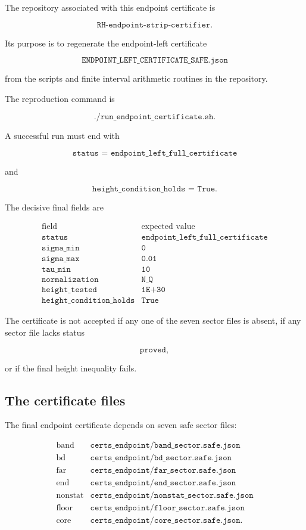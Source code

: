 \documentclass[11pt]{article}
\begin{document}
The repository associated with this endpoint certificate is

\[
\texttt{RH-endpoint-strip-certifier}.
\]

Its purpose is to regenerate the endpoint-left certificate

\[
\texttt{ENDPOINT\_LEFT\_CERTIFICATE\_SAFE.json}
\]

from the scripts and finite interval arithmetic routines in the repository.

The reproduction command is

\[
\texttt{./run\_endpoint\_certificate.sh}.
\]

A successful run must end with

\[
\texttt{status = endpoint\_left\_full\_certificate}
\]

and

\[
\texttt{height\_condition\_holds = True}.
\]

The decisive final fields are

\[
\begin{array}{ll}
\text{field} & \text{expected value} \\ \hline
\texttt{status} & \texttt{endpoint\_left\_full\_certificate} \\
\texttt{sigma\_min} & \texttt{0} \\
\texttt{sigma\_max} & \texttt{0.01} \\
\texttt{tau\_min} & \texttt{10} \\
\texttt{normalization} & \texttt{N\_Q} \\
\texttt{height\_tested} & \texttt{1E+30} \\
\texttt{height\_condition\_holds} & \texttt{True}
\end{array}
\]

The certificate is not accepted if any one of the seven sector files is absent, if any sector file lacks status

\[
\texttt{proved},
\]

or if the final height inequality fails.

\subsection{The certificate files}

The final endpoint certificate depends on seven safe sector files:

\[
\begin{array}{ll}
\mathrm{band} &
\texttt{certs\_endpoint/band\_sector.safe.json}
\\
\mathrm{bd} &
\texttt{certs\_endpoint/bd\_sector.safe.json}
\\
\mathrm{far} &
\texttt{certs\_endpoint/far\_sector.safe.json}
\\
\mathrm{end} &
\texttt{certs\_endpoint/end\_sector.safe.json}
\\
\mathrm{nonstat} &
\texttt{certs\_endpoint/nonstat\_sector.safe.json}
\\
\mathrm{floor} &
\texttt{certs\_endpoint/floor\_sector.safe.json}
\\
\mathrm{core} &
\texttt{certs\_endpoint/core\_sector.safe.json}.
\end{array}
\]
\end{document}
